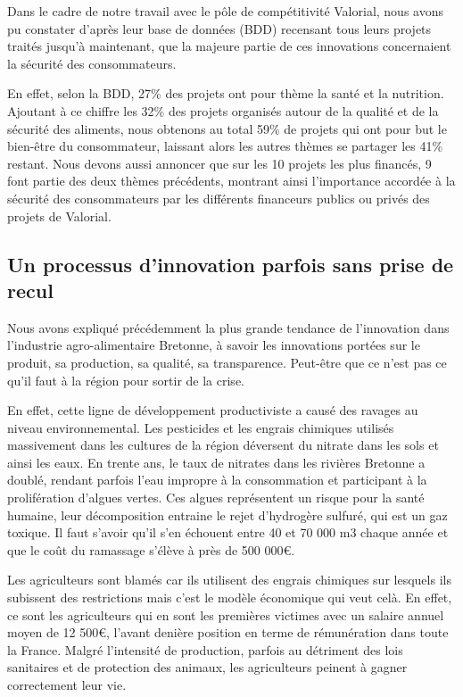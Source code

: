 \documentclass[a4paper,10pt]{report}
\begin{document}
			Dans le cadre de notre travail avec le pôle de compétitivité Valorial, nous avons pu constater d’après leur base de données (BDD) recensant tous leurs projets traités jusqu’à maintenant, que la majeure partie de ces innovations concernaient la sécurité des consommateurs. 
			
			En effet, selon la BDD, 27\% des projets ont pour thème la santé et la nutrition. Ajoutant à ce chiffre les 32\% des projets  organisés autour de la qualité et de la sécurité des aliments, nous obtenons au total 59\% de projets qui ont pour but le bien-être du consommateur, laissant alors les autres thèmes se partager les 41\% restant. Nous devons aussi annoncer que sur les 10 projets les plus financés, 9 font partie des deux thèmes précédents, montrant ainsi l’importance accordée à la sécurité des consommateurs par les différents financeurs publics ou privés des projets de Valorial.
						
		\subsection{Un processus d'innovation parfois sans prise de recul}
			
			Nous avons expliqué précédemment la plus grande tendance de l’innovation dans l’industrie agro-alimentaire Bretonne, à savoir les innovations portées sur le produit, sa production, sa qualité, sa transparence. Peut-être que ce n’est pas ce qu’il faut à la région pour sortir de la crise.
			
			En effet, cette ligne de développement productiviste a causé des ravages au niveau environnemental. Les pesticides et les engrais chimiques utilisés massivement dans les cultures de la région déversent du nitrate dans les sols et ainsi les eaux. En trente ans, le taux de nitrates dans les rivières Bretonne a doublé, rendant parfois l’eau impropre à la consommation et participant à la prolifération d’algues vertes\cite{NitratesAlguesVertesBretagne}. Ces algues représentent un risque pour la santé humaine, leur décomposition entraine le rejet d’hydrogère sulfuré, qui est un gaz toxique. Il faut s’avoir qu’il s’en échouent entre 40 et 70 000 m3 chaque année et que le coût du ramassage s’élève à près de 500 000\euro.
			
			Les agriculteurs sont blamés car ils utilisent des engrais chimiques sur lesquels ils subissent des restrictions mais c’est le modèle économique qui veut celà. En effet, ce sont les agriculteurs qui en sont les premières victimes avec un salaire annuel moyen de 12 500\euro, l’avant denière position en terme de rémunération dans toute la France\cite{AlguesVertesNouvellePreuveRavagesProductivismeAgricole}. Malgré l’intensité de production, parfois au détriment des lois sanitaires et de protection des animaux, les agriculteurs peinent à gagner correctement leur vie.
			
\end{document}
